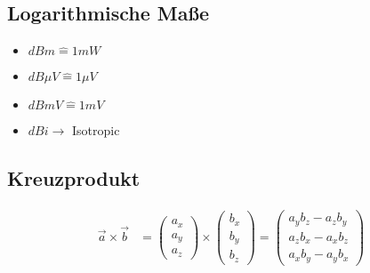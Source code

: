 \subsection{Logarithmische Maße}

    \begin{itemize}
        \setlength\itemsep{0pt}
        \item $\si{dBm} \hat=  1\si{mW}$
        \item $\si{dB\mu} V \hat= 1\si{\mu V}$
        \item $\si{dBmV} \hat{=} 1mV$
        \item $\si{dBi} \rightarrow$ Isotropic
    \end{itemize}
\subsection{Kreuzprodukt}
\begin{align*}
    \vec{a}\times\vec{b} & =
    \begin{pmatrix}
        a_x \\
        a_y \\
        a_z
    \end{pmatrix}
    \times
    \begin{pmatrix}
        b_x \\
        b_y \\
        b_z
    \end{pmatrix} =
    \begin{pmatrix}
        a_yb_z-a_zb_y \\
        a_zb_x-a_xb_z \\
        a_xb_y-a_yb_x
    \end{pmatrix}
\end{align*}

